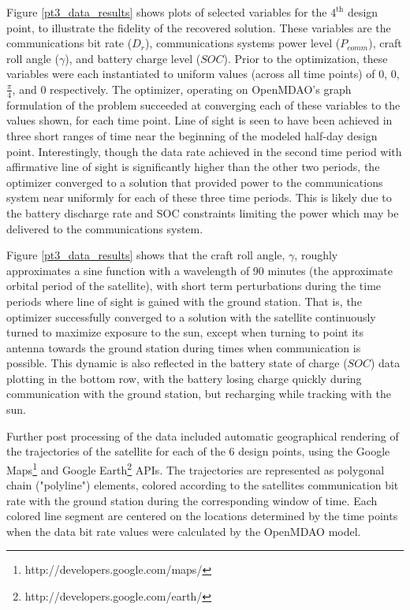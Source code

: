 \documentclass[]{aiaa-tc} %
\begin{document}
    Figure \ref{pt3_data_results} shows plots of selected variables for the $4^{\textrm{th}}$ design point,
    to illustrate the fidelity of the recovered solution. These variables are the communications
    bit rate ($D_r$), communications systems power level ($P_{comm}$), craft roll angle ($\gamma$),
    and battery charge level ($SOC$). Prior to the optimization, these variables
    were each instantiated to uniform values
    (across all time points) of 0, 0, $\frac{\pi}{4}$, and 0 respectively. The optimizer, operating on
    OpenMDAO's graph formulation of the problem succeeded at converging each of these variables to the values
    shown, for each time point. Line of sight is seen to have been achieved in three short ranges of time near the
    beginning of the modeled half-day design point. Interestingly, though the data rate achieved in the second
    time period with affirmative line of sight is significantly higher than the other two periods, the optimizer
    converged to a solution that provided power to the communications system near uniformly for each of these
    three time periods. This is likely due to the battery discharge rate and SOC constraints limiting
    the power which may be delivered to the communications system.

    Figure \ref{pt3_data_results} shows that the craft roll angle, $\gamma$, roughly approximates a sine function
    with a wavelength of 90 minutes (the approximate orbital period of the satellite),
    with short term perturbations during the time
    periods where line of sight is gained with the ground station. That is, the optimizer successfully
    converged to a solution with the satellite continuously turned to maximize exposure to the sun,
    except when turning to point its antenna towards the ground station during times when
    communication is possible. This dynamic is also reflected in the battery state of charge ($SOC$)
    data plotting in the bottom row, with the battery losing charge quickly during
    communication with the ground station, but recharging while tracking with the sun.

    Further post processing of the data included automatic geographical rendering of the trajectories of
    the  satellite for each of the 6 design points, using the Google
    Maps\footnote{http://developers.google.com/maps/} and Google
    Earth\footnote{http://developers.google.com/earth/} APIs. The trajectories are
    represented as polygonal chain ("polyline") elements, colored according to the
    satellites communication bit rate with the ground station during the corresponding
    window of time. Each colored line segment are centered on the locations
    determined by the time points when the data bit rate values were calculated
    by the OpenMDAO model.
\end{document}
